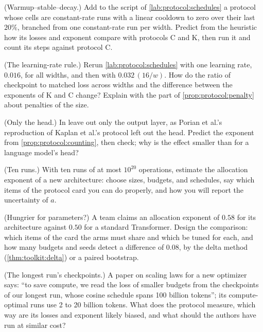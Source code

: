 \begin{refsection}
\begin{exercises}
\item \labwork (Warmup--stable--decay.) Add to the script of \cref{lab:protocol:schedules} a protocol whose cells are constant-rate runs with a linear cooldown to zero over their last $20\%$, branched from one constant-rate run per width. Predict from the heuristic how its losses and exponent compare with protocols C and K, then run it and count its steps against protocol C. \label{ex:protocol:wsd}

\item \labwork (The learning-rate rule.) Rerun \cref{lab:protocol:schedules} with one learning rate, $0.016$, for all widths, and then with $0.032\,(16/w)$. How do the ratio of checkpoint to matched loss across widths and the difference between the exponents of K and C change? Explain with the part of \cref{prop:protocol:penalty} about penalties of the size.\label{ex:protocol:lrrule}

\item \labwork (Only the head.) In  leave out only the output layer, as Porian et al.'s reproduction of Kaplan et al.'s protocol left out the head. Predict the exponent from \cref{prop:protocol:counting}, then check; why is the effect smaller than for a language model's head?\label{ex:protocol:head}

\item \design (Ten runs.) With ten runs of at most $10^{20}$ operations, estimate the allocation exponent of a new architecture: choose sizes, budgets, and schedules, say which items of the protocol card you can do properly, and how you will report the uncertainty of $a$.\label{ex:protocol:tenruns}

\item \design (Hungrier for parameters?) A team claims an allocation exponent of $0.58$ for its architecture against $0.50$ for a standard Transformer. Design the comparison: which items of the card the arms must share and which be tuned for each, and how many budgets and seeds detect a difference of $0.08$, by the delta method (\cref{thm:toolkit:delta}) or a paired bootstrap.\label{ex:protocol:compare}

\item \critique (The longest run's checkpoints.) A paper on scaling laws for a new optimizer says: \enquote{to save compute, we read the loss of smaller budgets from the checkpoints of our longest run, whose cosine schedule spans 100 billion tokens}; its compute-optimal runs use 2 to 20 billion tokens. What does the protocol measure, which way are its losses and exponent likely biased, and what should the authors have run at similar cost?\label{ex:protocol:critique1}


\end{exercises}
\end{refsection}
